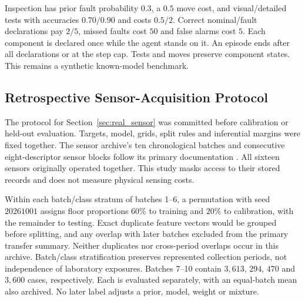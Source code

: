 \documentclass[runningheads]{llncs}
\begin{document}
Inspection has prior fault probability $0.3$, a $0.5$ move cost, and visual/detailed tests with accuracies $0.70/0.90$ and costs $0.5/2$. Correct nominal/fault declarations pay $2/5$, missed faults cost $50$ and false alarms cost $5$. Each component is declared once while the agent stands on it. An episode ends after all declarations or at the step cap. Tests and moves preserve component states. This remains a synthetic known-model benchmark.

\FloatBarrier

\subsection{Retrospective Sensor-Acquisition Protocol}
\label{app:real_sensor}

The protocol for Section~\ref{sec:real_sensor} was committed before calibration or held-out evaluation. Targets, model, grids, split rules and inferential margins were fixed together. The sensor archive's ten chronological batches and consecutive eight-descriptor sensor blocks follow its primary documentation \citep{vergara2012data}. All sixteen sensors originally operated together. This study masks access to their stored records and does not measure physical sensing costs.

Within each batch/class stratum of batches 1--6, a permutation with seed $20261001$ assigns floor proportions $60\%$ to training and $20\%$ to calibration, with the remainder to testing. Exact duplicate feature vectors would be grouped before splitting, and any overlap with later batches excluded from the primary transfer summary. Neither duplicates nor cross-period overlaps occur in this archive. Batch/class stratification preserves represented collection periods, not independence of laboratory exposures. Batches 7--10 contain $3{,}613$, $294$, $470$ and $3{,}600$ cases, respectively. Each is evaluated separately, with an equal-batch mean also archived. No later label adjusts a prior, model, weight or mixture.
\end{document}
